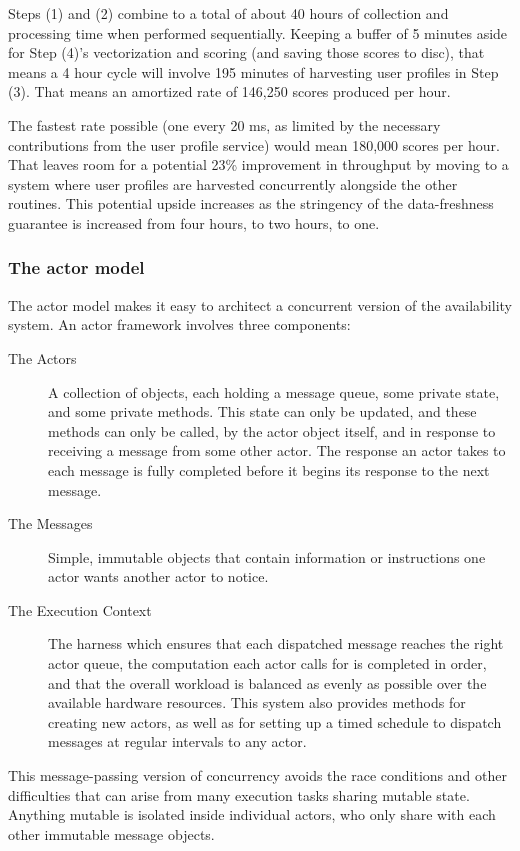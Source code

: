 \documentclass[tablecaption=bottom,wcp]{jmlr}
\begin{document}
 Steps (1) and (2) combine to a total of about 40 hours of collection and
processing time when performed sequentially. Keeping a buffer of 5 minutes aside
for Step (4)'s vectorization and scoring (and saving those scores to disc), that
means a 4 hour cycle will involve 195 minutes of harvesting user profiles in
Step (3). That means an amortized rate of 146,250 scores produced per hour. 

The fastest rate possible (one every 20 ms, as limited by the necessary
contributions from the user profile service) would mean 180,000 scores per
hour. That leaves room for a potential 23\% improvement in throughput
by moving to a system where user profiles are harvested concurrently
alongside the other routines. This potential upside increases as the
stringency of the data-freshness guarantee is increased from four
hours, to two hours, to one.

\subsubsection{The actor model}

The actor model makes it easy to architect a concurrent version of the
availability system. An actor framework involves three components:

\begin{description}
\item[The Actors] A collection of objects, each holding a message queue, some 
private state, and some private methods. This state can only be updated, and
these methods can only be called, by the actor object itself, and in response to 
receiving a message from some other actor. The response an actor takes to each
message is fully completed before it begins its response to the next message.
\item[The Messages] Simple, immutable objects that contain information or 
instructions one actor wants another actor to notice. 
\item[The Execution Context] The harness which ensures that each dispatched 
message reaches the right actor queue, the computation each actor calls for is
completed in order, and that the overall workload is balanced as evenly as possible
over the available hardware resources. This system also provides methods for
creating new actors, as well as for setting up a timed schedule to dispatch
messages at regular intervals to any actor.
\end{description}

This message-passing version of concurrency avoids the race conditions and
other difficulties that can arise from many execution tasks sharing mutable state.
Anything mutable is isolated inside individual actors, who only share with each
other immutable message objects.
\end{document}
